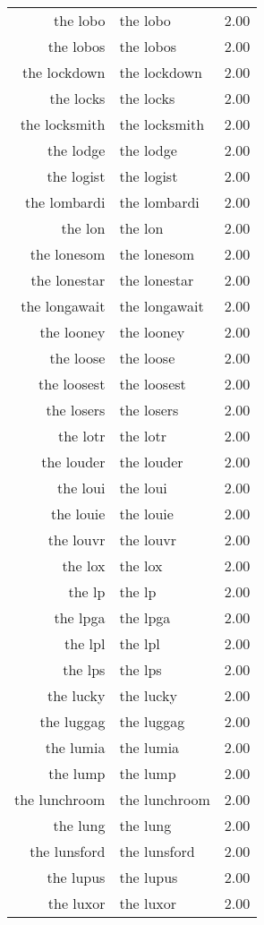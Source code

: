 \begin{table}[ht]
\begin{tabular}{rlr}
  the lobo & the lobo & 2.00 \\ 
  the lobos & the lobos & 2.00 \\ 
  the lockdown & the lockdown & 2.00 \\ 
  the locks & the locks & 2.00 \\ 
  the locksmith & the locksmith & 2.00 \\ 
  the lodge & the lodge & 2.00 \\ 
  the logist & the logist & 2.00 \\ 
  the lombardi & the lombardi & 2.00 \\ 
  the lon & the lon & 2.00 \\ 
  the lonesom & the lonesom & 2.00 \\ 
  the lonestar & the lonestar & 2.00 \\ 
  the longawait & the longawait & 2.00 \\ 
  the looney & the looney & 2.00 \\ 
  the loose & the loose & 2.00 \\ 
  the loosest & the loosest & 2.00 \\ 
  the losers & the losers & 2.00 \\ 
  the lotr & the lotr & 2.00 \\ 
  the louder & the louder & 2.00 \\ 
  the loui & the loui & 2.00 \\ 
  the louie & the louie & 2.00 \\ 
  the louvr & the louvr & 2.00 \\ 
  the lox & the lox & 2.00 \\ 
  the lp & the lp & 2.00 \\ 
  the lpga & the lpga & 2.00 \\ 
  the lpl & the lpl & 2.00 \\ 
  the lps & the lps & 2.00 \\ 
  the lucky & the lucky & 2.00 \\ 
  the luggag & the luggag & 2.00 \\ 
  the lumia & the lumia & 2.00 \\ 
  the lump & the lump & 2.00 \\ 
  the lunchroom & the lunchroom & 2.00 \\ 
  the lung & the lung & 2.00 \\ 
  the lunsford & the lunsford & 2.00 \\ 
  the lupus & the lupus & 2.00 \\ 
  the luxor & the luxor & 2.00 \\ 

\end{tabular}
\end{table}
